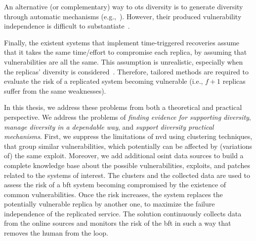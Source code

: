 An alternative (or complementary) way to \gls{ots} diversity is to generate diversity through automatic mechanisms (e.g.,~\cite{Roeder:2010,Amir:2011}).
However, their produced vulnerability independence is difficult to substantiate~\cite{Snow:2013,Bittau:2014}. 

Finally, the existent systems that implement time-triggered recoveries assume that it takes the same time/effort to compromise each replica, by assuming that vulnerabilities are all the same. 
This assumption is unrealistic, especially when the replicas' diversity is considered~\cite{Nayak:2014}. 
Therefore, tailored methods are required to evaluate the risk of a replicated system becoming vulnerable (i.e., $f+1$ replicas suffer from the same weaknesses).


In this thesis, we address these problems from both a theoretical and practical perspective.
We address the problems of \emph{finding evidence for supporting diversity}, \emph{manage diversity in a dependable way}, and \emph{support diversity practical mechanisms}.
First, we suppress the limitations of \gls{nvd} using clustering techniques, that group similar vulnerabilities, which potentially can be affected by (variations of) the same exploit.
Moreover, we add additional \gls{osint} data sources to build a complete knowledge base about the possible vulnerabilities, exploits, and patches related to the systems of interest. 
The clusters and the collected data are used to assess the risk of a \gls{bft} system becoming compromised by the existence of common vulnerabilities.
Once the risk increases, the system replaces the potentially vulnerable replica by another one, to maximize the failure independence of the replicated service.
The solution continuously collects data from the online sources and monitors the risk of the \gls{bft} in such a way that removes the human from the loop.

